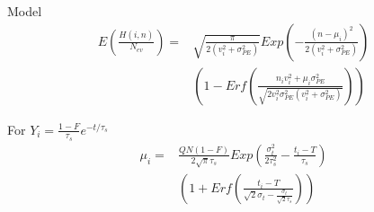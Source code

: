 \documentclass{beamer}
\begin{document}
\begin{frame}{Model}
\begin{equation}
\begin{split}
E\left(\frac{H(i,n)}{N_{ev}}\right)=&\sqrt{\frac{\pi}{2(v_i^2+\sigma_{PE}^2)}}Exp\left(-\frac{(n-\mu_i)^2}{2(v_i^2+\sigma_{PE}^2)}\right)\\
&\left(1-Erf\left(\frac{n_iv_i^2+\mu_i\sigma_{PE}^2}{\sqrt{2v_i^2\sigma_{PE}^2(v_i^2+\sigma_{PE}^2)}}\right)\right)
\end{split}
\end{equation}
\end{frame}

\begin{frame}
For $Y_i=\frac{1-F}{\tau_s}e^{-t/\tau_s}$
\begin{equation}
\begin{split}
\mu_i=&\frac{QN(1-F)}{2\sqrt{\pi}\tau_s}Exp\left(\frac{\sigma_t^2}{2\tau_s^2}-\frac{t_i-T}{\tau_s}
\right)\\
&\left(1+Erf\left(\frac{t_i-T}{\sqrt{2}\sigma_t-\frac{\sigma_t}{\sqrt{2}\tau_s}}\right)\right)
\end{split}
\end{equation}
\end{frame}
\end{document}
